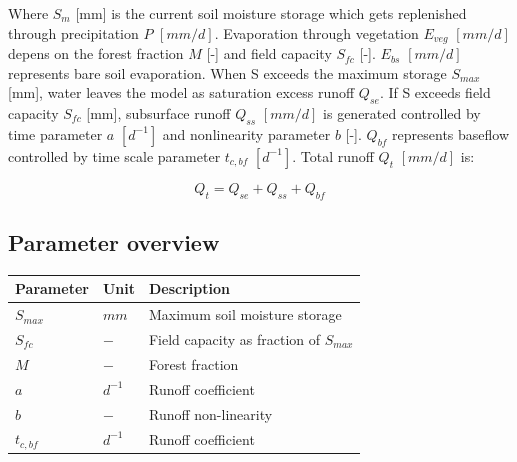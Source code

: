 Where $S_m$ [mm] is the current soil moisture storage which gets replenished through precipitation $P$ $[mm/d]$. 
Evaporation through vegetation $E_{veg}$ $[mm/d]$ depens on the forest fraction $M$ [-] and field capacity $S_{fc}$ [-]. 
$E_{bs}$ $[mm/d]$ represents bare soil evaporation. 
When S exceeds the maximum storage $S_{max}$ [mm], water leaves the model as saturation excess runoff $Q_{se}$. 
If S exceeds field capacity $S_{fc}$ [mm], subsurface runoff $Q_{ss}$ $[mm/d]$ is generated controlled by time parameter $a$ $[d^{-1}]$ and nonlinearity parameter $b$ [-]. 
$Q_{bf}$ represents baseflow controlled by time scale parameter $t_{c,bf}$ $[d^{-1}]$. Total runoff $Q_t$ $[mm/d]$ is:

\begin{equation}
	Q_t = Q_{se} + Q_{ss} + Q_{bf}
\end{equation}

\newpage
\subsection{Parameter overview}
\begin{table}[htbp]
  \centering
    \begin{tabular}{lll}
    \toprule
    Parameter & Unit  & Description \\
    \midrule
    $S_{max}$ & $mm$  & Maximum soil moisture storage \\
    $S_{fc}$ & $-$   & Field capacity as fraction of $S_{max}$ \\
    $M$   & $-$   & Forest fraction \\
    $a$   & $d^{-1}$ & Runoff coefficient \\
    $b$   & $-$   & Runoff non-linearity \\
    $t_{c,bf}$ & $d^{-1}$ & Runoff coefficient \\
    \bottomrule
    \end{tabular}%
  \label{tab:addlabel}%
\end{table}%



